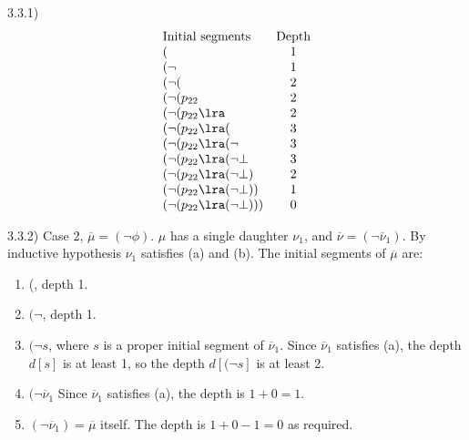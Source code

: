 3.3.1)
\[
  \begin{array}{lc}
    \text{Initial segments} & \text{Depth} \\
    (                            & 1 \\
    (\neg                        & 1 \\
    (\neg(                       & 2 \\
    (\neg(p_{22}                 & 2 \\
    (\neg(p_{22}\lra             & 2 \\
    (\neg(p_{22}\lra(            & 3 \\
    (\neg(p_{22}\lra(\neg        & 3 \\
    (\neg(p_{22}\lra(\neg\bot    & 3 \\
    (\neg(p_{22}\lra(\neg\bot)   & 2 \\
    (\neg(p_{22}\lra(\neg\bot))  & 1 \\
    (\neg(p_{22}\lra(\neg\bot))) & 0 \\
  \end{array}
\]

3.3.2) Case 2, \(\overline{\mu} = (\neg \phi)\). \(\mu\) has a single
daughter \(\nu_1\), and \(\overline{\nu} = (\neg\overline{\nu}_1)\). By
inductive hypothesis \(\nu_1\) satisfies (a) and (b). The initial segments of
\(\overline{\mu}\) are:
\begin{enumerate}
  \item (, depth 1.
  \item \((\neg\), depth 1.
  \item \((\neg s\), where \(s\) is a proper initial segment of
  \(\overline{\nu}_1\). Since \(\overline{\nu}_1\) satisfies (a), the depth
  \(d[s]\) is at least 1, so the depth \(d[(\neg s]\) is at least 2.
  \item \((\neg\overline{\nu}_1\) Since \(\overline{\nu}_1\) satisfies (a), the depth is \(1+0=1\).
  \item \((\neg\overline{\nu}_1) = \overline{\mu}\) itself. The depth is \(1+0-1=0\) as required.
\end{enumerate}

